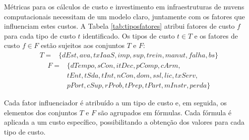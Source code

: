 \documentclass[tese,capa]{texufpel}
\begin{document}
Métricas para os cálculos de custo e investimento em infraestruturas de nuvens computacionais necessitam de um modelo claro, juntamente com os fatores que influenciam estes custos. A Tabela \ref{tab:tiposfatores} atribui fatores de custo $f$ para cada tipo de custo $t$ identificado. Os tipos de custo $t \in T$ e os fatores de custo $f \in F$ estão sujeitos aos conjuntos $T$ e $F$:
\begin{equation}
  \begin{aligned}
    T = {} & \{dEst,ava,txIaaS,imp,sup,trein,manut,falha,bs\}
  \end{aligned}
\end{equation}
\begin{equation}
  \begin{aligned}
    F = {} & \{dTempo,sCon,itDec,pComp,cArm,\\ 
          & tEnt,tSda,tInt,nCon,dom,ssl,lic,txServ,\\
          & pPort,cSup,rProb,tPrep,tPart,mInstr,perda\}
  \end{aligned}
\end{equation}

Cada fator influenciador é atribuído a um tipo de custo e, em seguida, os elementos dos conjuntos $T$ e $F$ são agrupados em fórmulas. Cada fórmula é aplicada a um custo específico, possibilitando a obtenção dos valores para cada tipo de custo.
\end{document}
